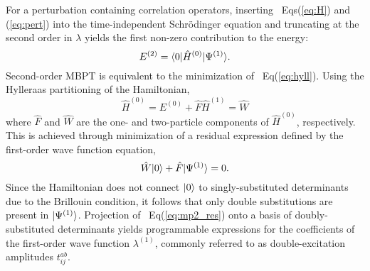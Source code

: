 For a perturbation containing correlation operators, inserting
~Eqs(\ref{eq:H}) and (\ref{eq:pert}) into the time-independent Schr\"odinger
equation and truncating at the second order in $\lambda$ yields the first
non-zero contribution to the energy:\cite{Szabo1996} \begin{equation}
\label{eq:hyll}
    E^{(2)} = \langle0 |\hat{H}^{(0)}| \Psi^{(1)} \rangle.
\end{equation} Second-order MBPT is equivalent to the minimization
of ~Eq(\ref{eq:hyll}).  Using the Hylleraas partitioning of the
Hamiltonian,\cite{Pulay1986b} \begin{subequations}
    \begin{equation}
        \hat{H}^{(0)} = E^{(0)} + \hat{F}
    \end{equation} \begin{equation}
        \hat{H}^{(1)} = \hat{W}
    \end{equation}
\end{subequations} where $\hat{F}$ and $\hat{W}$ are the one- and
two-particle components of $\hat{H}^{(0)}$, respectively.  This is achieved
through minimization of a residual expression defined by the first-order
wave function equation, \begin{equation} \label{eq:mp2_res}
    \hat{W}| 0 \rangle + \hat{F}| \Psi^{(1)} \rangle = 0.
\end{equation} Since the Hamiltonian does not connect
$| 0 \rangle$ to singly-substituted determinants due to the Brillouin
condition,\cite{Szabo1996} it follows that only double substitutions are
present in $| \Psi^{(1)} \rangle$.  Projection of ~Eq(\ref{eq:mp2_res}) onto a
basis of doubly-substituted determinants yields programmable expressions
for the coefficients of the first-order wave function $\lambda^{(1)}$,
commonly referred to as double-excitation amplitudes $t^{ab}_{ij}$.

